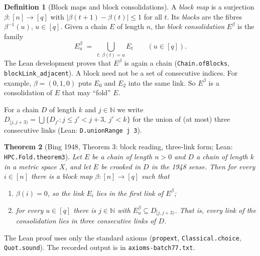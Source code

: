\documentclass[11pt]{article}
\newtheorem{theorem}{Theorem}[section]
\theoremstyle{definition}
\newtheorem{definition}[theorem]{Definition}
\theoremstyle{remark}
\newcommand{\N}{\mathbb{N}}
\newcommand{\lean}[1]{\texttt{#1}}
\begin{document}
\begin{definition}[Block maps and block consolidations]\label{def:block}
A \emph{block map} is a surjection $\beta:[n]\to[q]$ with
$|\beta(t+1)-\beta(t)|\le1$ for all $t$. Its \emph{blocks} are the fibres
$\beta^{-1}(u)$, $u\in[q]$. Given a chain $E$ of length $n$, the
\emph{block consolidation} $E^\beta$ is the family
\[
E^\beta_u \;=\; \bigcup_{t:\ \beta(t)=u} E_t\qquad(u\in[q]).
\]
The Lean development proves that $E^\beta$ is again a chain
(\lean{Chain.ofBlocks}, \lean{blockLink\_adjacent}). A block need not be a set
of consecutive indices. For example, $\beta=(0,1,0)$ puts $E_0$ and $E_2$ into
the same link. So $E^\beta$ is a consolidation of $E$ that may ``fold'' $E$.
\end{definition}

For a chain $D$ of length $k$ and $j\in\N$ we write
$D_{[j,j+3)}=\bigcup\{D_{j'} : j\le j'<j+3,\ j'<k\}$ for the union of (at most)
three consecutive links (Lean: \lean{D.unionRange j 3}).

\begin{theorem}[Bing 1948, Theorem 3: block reading, three-link form;
Lean: \lean{HPC.Fold.theorem3}]\label{thm:main}
Let $E$ be a chain of length $n>0$ and $D$ a chain of length $k$ in a metric
space $X$, and let $E$ be crooked in $D$ in the 1948 sense. Then for every
$i\in[n]$ there is a block map $\beta:[n]\to[q]$ such that
\begin{enumerate}[label=(\roman*)]
\item $\beta(i)=0$, so the link $E_i$ lies in the first link of $E^\beta$;
\item for every $u\in[q]$ there is $j\in\N$ with
$E^\beta_u\subseteq D_{[j,j+3)}$. That is, every link of the consolidation lies
in three consecutive links of $D$.
\end{enumerate}
\end{theorem}

The Lean proof uses only the standard axioms (\lean{propext},
\lean{Classical.choice}, \lean{Quot.sound}). The recorded output is in
\lean{axioms-batch77.txt}.
\end{document}
